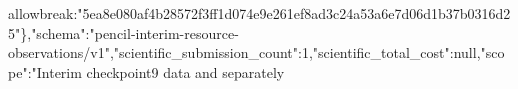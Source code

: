 \documentclass[10pt]{article}
\begin{document}
allowbreak{}:\allowbreak{}"\allowbreak{}5\allowbreak{}e\allowbreak{}a\allowbreak{}8\allowbreak{}e\allowbreak{}0\allowbreak{}8\allowbreak{}0\allowbreak{}a\allowbreak{}f\allowbreak{}4\allowbreak{}b\allowbreak{}2\allowbreak{}8\allowbreak{}5\allowbreak{}7\allowbreak{}2\allowbreak{}f\allowbreak{}3\allowbreak{}f\allowbreak{}f\allowbreak{}1\allowbreak{}d\allowbreak{}0\allowbreak{}7\allowbreak{}4\allowbreak{}e\allowbreak{}9\allowbreak{}e\allowbreak{}2\allowbreak{}6\allowbreak{}1\allowbreak{}e\allowbreak{}f\allowbreak{}8\allowbreak{}a\allowbreak{}d\allowbreak{}3\allowbreak{}c\allowbreak{}2\allowbreak{}4\allowbreak{}a\allowbreak{}5\allowbreak{}3\allowbreak{}a\allowbreak{}6\allowbreak{}e\allowbreak{}7\allowbreak{}d\allowbreak{}0\allowbreak{}6\allowbreak{}d\allowbreak{}1\allowbreak{}b\allowbreak{}3\allowbreak{}7\allowbreak{}b\allowbreak{}0\allowbreak{}3\allowbreak{}1\allowbreak{}6\allowbreak{}d\allowbreak{}2\allowbreak{}5\allowbreak{}"\allowbreak{}\}\allowbreak{},\allowbreak{}"\allowbreak{}s\allowbreak{}c\allowbreak{}h\allowbreak{}e\allowbreak{}m\allowbreak{}a\allowbreak{}"\allowbreak{}:\allowbreak{}"\allowbreak{}p\allowbreak{}e\allowbreak{}n\allowbreak{}c\allowbreak{}i\allowbreak{}l\allowbreak{}-\allowbreak{}i\allowbreak{}n\allowbreak{}t\allowbreak{}e\allowbreak{}r\allowbreak{}i\allowbreak{}m\allowbreak{}-\allowbreak{}r\allowbreak{}e\allowbreak{}s\allowbreak{}o\allowbreak{}u\allowbreak{}r\allowbreak{}c\allowbreak{}e\allowbreak{}-\allowbreak{}o\allowbreak{}b\allowbreak{}s\allowbreak{}e\allowbreak{}r\allowbreak{}v\allowbreak{}a\allowbreak{}t\allowbreak{}i\allowbreak{}o\allowbreak{}n\allowbreak{}s\allowbreak{}/\allowbreak{}v\allowbreak{}1\allowbreak{}"\allowbreak{},\allowbreak{}"\allowbreak{}s\allowbreak{}c\allowbreak{}i\allowbreak{}e\allowbreak{}n\allowbreak{}t\allowbreak{}i\allowbreak{}f\allowbreak{}i\allowbreak{}c\allowbreak{}\_\allowbreak{}s\allowbreak{}u\allowbreak{}b\allowbreak{}m\allowbreak{}i\allowbreak{}s\allowbreak{}s\allowbreak{}i\allowbreak{}o\allowbreak{}n\allowbreak{}\_\allowbreak{}c\allowbreak{}o\allowbreak{}u\allowbreak{}n\allowbreak{}t\allowbreak{}"\allowbreak{}:\allowbreak{}1\allowbreak{},\allowbreak{}"\allowbreak{}s\allowbreak{}c\allowbreak{}i\allowbreak{}e\allowbreak{}n\allowbreak{}t\allowbreak{}i\allowbreak{}f\allowbreak{}i\allowbreak{}c\allowbreak{}\_\allowbreak{}t\allowbreak{}o\allowbreak{}t\allowbreak{}a\allowbreak{}l\allowbreak{}\_\allowbreak{}c\allowbreak{}o\allowbreak{}s\allowbreak{}t\allowbreak{}"\allowbreak{}:\allowbreak{}n\allowbreak{}u\allowbreak{}l\allowbreak{}l\allowbreak{},\allowbreak{}"\allowbreak{}s\allowbreak{}c\allowbreak{}o\allowbreak{}p\allowbreak{}e\allowbreak{}"\allowbreak{}:\allowbreak{}"\allowbreak{}I\allowbreak{}n\allowbreak{}t\allowbreak{}e\allowbreak{}r\allowbreak{}i\allowbreak{}m\allowbreak{} \allowbreak{}c\allowbreak{}h\allowbreak{}e\allowbreak{}c\allowbreak{}k\allowbreak{}p\allowbreak{}o\allowbreak{}i\allowbreak{}n\allowbreak{}t\allowbreak{}9\allowbreak{} \allowbreak{}d\allowbreak{}a\allowbreak{}t\allowbreak{}a\allowbreak{} \allowbreak{}a\allowbreak{}n\allowbreak{}d\allowbreak{} \allowbreak{}s\allowbreak{}e\allowbreak{}p\allowbreak{}a\allowbreak{}r\allowbreak{}a\allowbreak{}t\allowbreak{}e\allowbreak{}l\allowbreak{}y\allowbreak{} 
\end{document}
